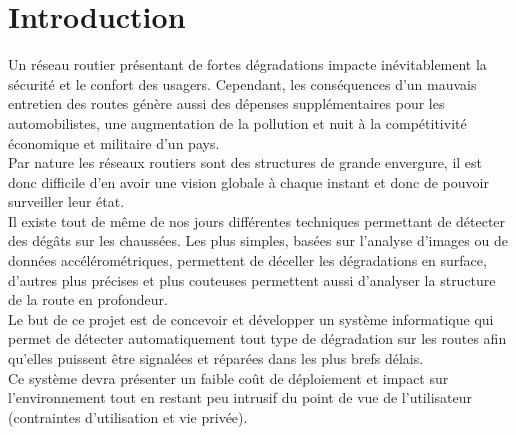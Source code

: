 \section{Introduction}
Un réseau routier présentant de fortes dégradations impacte inévitablement la
sécurité et le confort des usagers. Cependant, les conséquences d'un mauvais
entretien des routes génère aussi des dépenses supplémentaires pour les
automobilistes, une augmentation de la pollution et nuit à la compétitivité
économique et militaire d'un pays.\\

Par nature les réseaux routiers sont des structures de grande envergure, il est
donc difficile d'en avoir une vision globale à chaque instant et donc de
pouvoir surveiller leur état.\\
Il existe tout de même de nos jours différentes techniques permettant de
détecter des dégâts sur les chaussées. Les plus simples, basées sur l'analyse
d'images ou de données accélérométriques, permettent de déceller les
dégradations en surface, d'autres plus précises et plus couteuses permettent
aussi d'analyser la structure de la route en profondeur.\\

Le but de ce projet est de concevoir et développer un système informatique qui
permet de détecter automatiquement tout type de dégradation sur les routes afin
qu'elles puissent être signalées et réparées dans les plus brefs délais.\\
Ce système devra présenter un faible coût de déploiement et impact sur
l'environnement tout en restant peu intrusif du point de vue de l'utilisateur
(contraintes d'utilisation et vie privée).